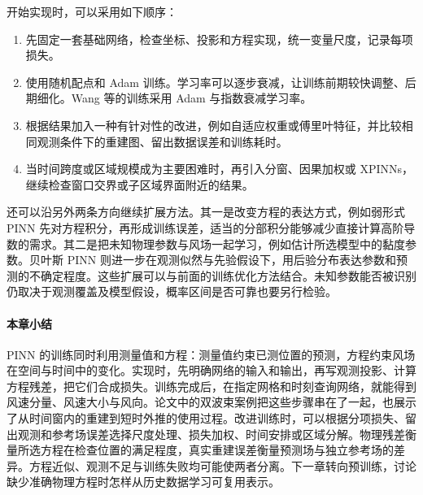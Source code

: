 开始实现时，可以采用如下顺序：
\begin{enumerate}
 \item 先固定一套基础网络，检查坐标、投影和方程实现，统一变量尺度，记录每项损失。
 \item 使用随机配点和 Adam 训练。学习率可以逐步衰减，让训练前期较快调整、后期细化。Wang 等的训练采用 Adam 与指数衰减学习率\cite{wang2023expert}。
 \item 根据结果加入一种有针对性的改进，例如自适应权重或傅里叶特征，并比较相同观测条件下的重建图、留出数据误差和训练耗时。
 \item 当时间跨度或区域规模成为主要困难时，再引入分窗、因果加权或 XPINNs，继续检查窗口交界或子区域界面附近的结果。
\end{enumerate}

还可以沿另外两条方向继续扩展方法。其一是改变方程的表达方式，例如弱形式 PINN 先对方程积分，再形成训练误差，适当的分部积分能够减少直接计算高阶导数的需求\cite{kharazmi2021hpvpinn}。其二是把未知物理参数与风场一起学习，例如估计所选模型中的黏度参数。贝叶斯 PINN 则进一步在观测似然与先验假设下，用后验分布表达参数和预测的不确定程度\cite{yang2021bpinn}。这些扩展可以与前面的训练优化方法结合。未知参数能否被识别仍取决于观测覆盖及模型假设，概率区间是否可靠也要另行检验。

\FloatBarrier

\paragraph{本章小结}
PINN 的训练同时利用测量值和方程：测量值约束已测位置的预测，方程约束风场在空间与时间中的变化。实现时，先明确网络的输入和输出，再写观测投影、计算方程残差，把它们合成损失。训练完成后，在指定网格和时刻查询网络，就能得到风速分量、风速大小与风向。论文中的双波束案例把这些步骤串在了一起，也展示了从时间窗内的重建到短时外推的使用过程。改进训练时，可以根据分项损失、留出观测和参考场误差选择尺度处理、损失加权、时间安排或区域分解。物理残差衡量所选方程在检查位置的满足程度，真实重建误差衡量预测场与独立参考场的差异。方程近似、观测不足与训练失败均可能使两者分离。下一章转向预训练，讨论缺少准确物理方程时怎样从历史数据学习可复用表示。
